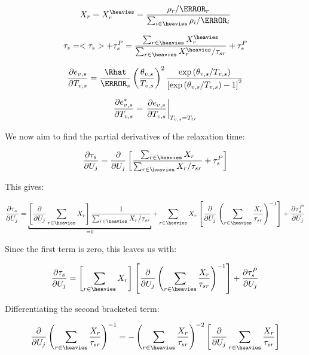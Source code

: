 \documentclass[10pt]{article}
\begin{document}
\begin{flushleft}
\begin{equation}
    X_r = X_r^{\heavies} = \frac{\rho_r / \MW_r}{\sum_{i \in \heavies} \rho_i / \MW_i}
\end{equation}

\begin{equation}
    \tau_s = <\tau_s> + \tau_s^P = \frac{\sum_{r \in \heavies} X_r^{\heavies}}{\sum_{r \in \heavies} X_r^{\heavies} / \tau_{sr}} + \tau_s^P
\end{equation}

\begin{equation}
    \pd{e_{v,s}}{T_{v,s}} = \frac{\Rhat}{\MW_s} \bp{\frac{\theta_{v,s}}{T_{v,s}}}^2 \frac{\exp{(\theta_{v,s} / T_{v,s})}}{\bb{\exp{(\theta_{v,s} / T_{v,s}) - 1}}^2}
\end{equation}

\begin{equation}
    \frac{\partial e_{v,s}^*}{\partial T_{v,s}} = \left. \frac{\partial e_{v,s}}{\partial T_{v,s}} \right|_{T_{v,s} = T_{tr}}
\end{equation}

We now aim to find the partial derivatives of the relaxation time:

\begin{equation}
    \pd{\tau_s}{U_j} = \pd{}{U_j} \bb{\frac{\sum_{r \in \heavies} X_r}{\sum_{r \in \heavies} X_r / \tau_{sr}} + \tau_s^P}
\end{equation}

This gives:

\begin{equation}
    \pd{\tau_s}{U_j} = \underbracket{ \bb{\pd{}{U_j} \sum_{r \in \heavies} X_r} \frac{1}{\sum_{r \in \heavies} X_r / \tau_{sr}}}_{= 0} + \sum_{r \in \heavies} X_r \bb{\pd{}{U_j} \bp{\sum_{r \in \heavies} \frac{X_r}{\tau_{sr}}}^{-1}} + \pd{\tau_s^P}{U_j}
\end{equation}

Since the first term is zero, this leaves us with:

\begin{equation}
    \pd{\tau_s}{U_j} = \bb{\sum_{r \in \heavies} X_r} \bb{\pd{}{U_j} \bp{\sum_{r \in \heavies} \frac{X_r}{\tau_{sr}}}^{-1} } + \pd{\tau_s^P}{U_j}
\end{equation}

Differentiating the second bracketed term:

\begin{equation}
    \pd{}{U_j} \bp{\sum_{r \in \heavies} \frac{X_r}{\tau_{sr}}}^{-1} = - \bp{\sum_{r \in \heavies} \frac{X_r}{\tau_{sr}}}^{-2} \bb{\pd{}{U_j} \sum_{r \in \heavies} \frac{X_r}{\tau_{sr}} }
\end{equation}


\end{flushleft}
\end{document}
